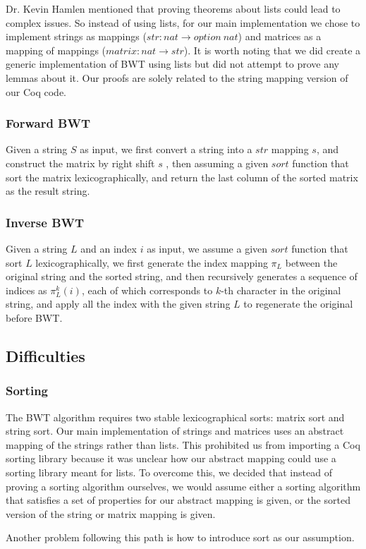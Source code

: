 \documentclass[11pt,letterpaper,titlepage]{article}
\begin{document}
Dr. Kevin Hamlen mentioned that proving theorems about lists could lead to
complex issues. So instead of using lists, for our main implementation we chose
to implement strings as mappings ($str: nat \rightarrow option\ nat$) and
matrices as a mapping of mappings ($matrix: nat \rightarrow str$). It is worth
noting that we did create a generic implementation of BWT using lists but did
not attempt to prove any lemmas about it. Our proofs are solely related to the
string mapping version of our Coq code.

\subsubsection{Forward BWT}

Given a string $S$ as input, we first convert a string into a $str$ mapping
$s$, and construct the matrix by right shift $s$ , then assuming a given $sort$
function that sort the matrix lexicographically, and return the last column of
the sorted matrix as the result string.

\subsubsection{Inverse BWT}

Given a string $L$ and an index $i$ as input, we assume a given $sort$ function
that sort $L$ lexicographically, we first generate the index mapping $\pi_L$
between the original string and the sorted string, and then recursively
generates a sequence of indices as $\pi_L^k(i)$, each of which corresponds to
$k$-th character in the original string, and apply all the index with the given
string $L$ to regenerate the original before BWT.

\subsection{Difficulties}

\subsubsection{Sorting}

The BWT algorithm requires two stable lexicographical sorts: matrix sort and
string sort. Our main implementation of strings and matrices uses an abstract
mapping of the strings rather than lists. This prohibited us from importing a
Coq sorting library because it was unclear how our abstract mapping could use a
sorting library meant for lists. To overcome this, we decided that instead of
proving a sorting algorithm ourselves, we would assume either a sorting
algorithm that satisfies a set of properties for our abstract mapping is given,
or the sorted version of the string or matrix mapping is given.

Another problem following this path is how to introduce sort as our
assumption.
\end{document}
